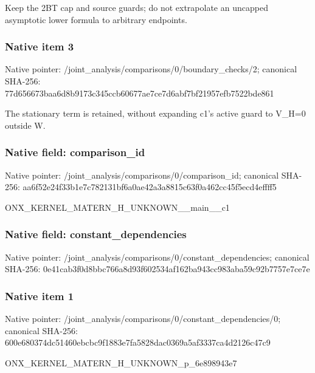 \documentclass[10pt,a4paper]{article}
\begin{document}
\begingroup\raggedright\sloppy Keep the 2BT cap and source guards;\allowbreak{} do not extrapolate an uncapped asymptotic lower formula to arbitrary endpoints.\par\endgroup

\subsubsection{Native item 3}
Native pointer: /joint\_\allowbreak{}analysis/comparisons/0/boundary\_\allowbreak{}checks/2; canonical SHA-256: 77d656673baa6d8b9173c345ccb60677ae7ce7d6abf7bf21957efb7522bde861

\begingroup\raggedright\sloppy The stationary term is retained,\allowbreak{} without expanding c1's active guard to V\_\allowbreak{}H=\allowbreak{}0 outside W.\par\endgroup

\subsubsection{Native field: comparison\_\allowbreak{}id}
Native pointer: /joint\_\allowbreak{}analysis/comparisons/0/comparison\_\allowbreak{}id; canonical SHA-256: aa6f52e24f33b1e7c782131bf6a0ae42a3a8815c63f0a462cc45f5ecd4effff5

\begingroup\raggedright\sloppy ONX\_\allowbreak{}KERNEL\_\allowbreak{}MATERN\_\allowbreak{}H\_\allowbreak{}UNKNOWN\_\allowbreak{}\_\allowbreak{}main\_\allowbreak{}\_\allowbreak{}c1\par\endgroup

\subsubsection{Native field: constant\_\allowbreak{}dependencies}
Native pointer: /joint\_\allowbreak{}analysis/comparisons/0/constant\_\allowbreak{}dependencies; canonical SHA-256: 0e41cab3f0d8bbc766a8d93f602534af162ba943cc983aba59c92b7757e7ce7e

\subsubsection{Native item 1}
Native pointer: /joint\_\allowbreak{}analysis/comparisons/0/constant\_\allowbreak{}dependencies/0; canonical SHA-256: 600e680374dc51460ebcbc9f1883e7fa5828dac0369a5af3337ca4d2126c47c9

\begingroup\raggedright\sloppy ONX\_\allowbreak{}KERNEL\_\allowbreak{}MATERN\_\allowbreak{}H\_\allowbreak{}UNKNOWN\_\allowbreak{}p\_\allowbreak{}6e898943e7\par\endgroup
\end{document}
